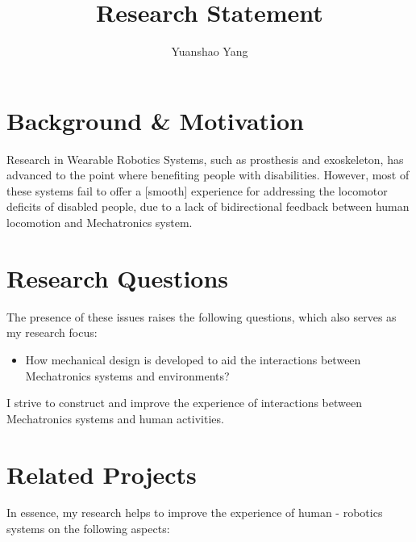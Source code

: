 \documentclass[8pt]{article}
\title{Research Statement}
\author{Yuanshao Yang}
\begin{document}
\maketitle


\section{Background \& Motivation}


Research in Wearable Robotics Systems, such as prosthesis and exoskeleton, has advanced to the point where benefiting people with disabilities. However, most of these systems fail to offer a [smooth] experience for addressing the locomotor deficits of disabled people, due to a lack of bidirectional feedback between human locomotion and Mechatronics system. 


\section{Research Questions}


The presence of these issues raises the following questions, which also serves as my research focus: 

\begin{itemize}
            
    \item {How mechanical design is developed to aid the interactions between Mechatronics systems and environments?}

\end{itemize}


I strive to construct and improve the experience of interactions between Mechatronics systems and human activities.


\section{Related Projects}

In essence, my research helps to improve the experience of human - robotics systems on the following aspects: 
\end{document}
